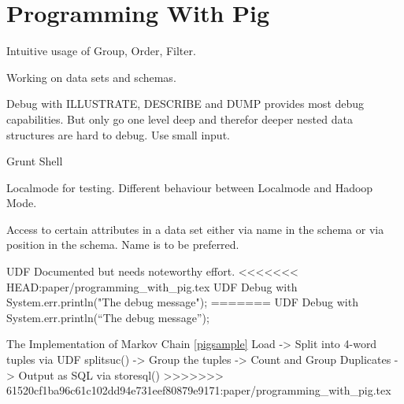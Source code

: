 \section{Programming With Pig}

Intuitive usage of Group, Order, Filter.

Working on data sets and schemas.

Debug with ILLUSTRATE, DESCRIBE and DUMP provides most debug capabilities. But only go one level deep and therefor deeper nested data structures are hard to debug. Use small input. 

Grunt Shell

Localmode for testing. Different behaviour between Localmode and Hadoop Mode.

Access to certain attributes in a data set either via name in the schema or via position in the schema. Name is to be preferred.

UDF Documented but needs noteworthy effort.
<<<<<<< HEAD:paper/programming_with_pig.tex
UDF Debug with System.err.println("The debug message");                    
=======
UDF Debug with System.err.println(``The debug message'');                    

The Implementation of Markov Chain \ref{pigsample}
Load -> Split into 4-word tuples via UDF splitsuc() -> Group the tuples -> Count and Group Duplicates -> Output as SQL via storesql()
>>>>>>> 61520cf1ba96c61c102dd94e731eef80879e9171:paper/programming_with_pig.tex
